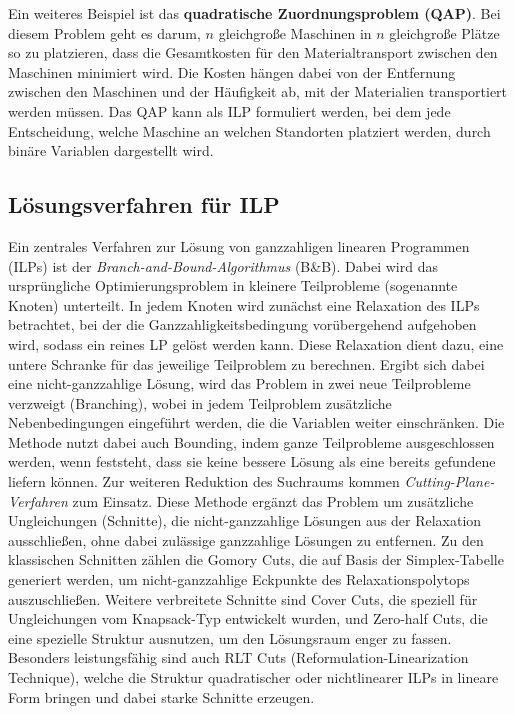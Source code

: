 \documentclass[bachelor, german]{algothesis}
\begin{document}
Ein weiteres Beispiel ist das \textbf{quadratische Zuordnungsproblem (QAP)}. Bei diesem Problem geht es darum, $n$ gleichgroße Maschinen in $n$ gleichgroße Plätze so zu platzieren, dass die Gesamtkosten für den Materialtransport zwischen den Maschinen minimiert wird. Die Kosten hängen dabei von der Entfernung zwischen den Maschinen und der Häufigkeit ab, mit der Materialien transportiert werden müssen. Das QAP kann als ILP formuliert werden, bei dem jede Entscheidung, welche Maschine an welchen Standorten platziert werden, durch binäre Variablen dargestellt wird.

\subsection{Lösungsverfahren für ILP}
Ein zentrales Verfahren zur Lösung von ganzzahligen linearen Programmen (ILPs) ist der \emph{Branch-and-Bound-Algorithmus} (B\&B). Dabei wird das ursprüngliche Optimierungsproblem in kleinere Teilprobleme (sogenannte Knoten) unterteilt. In jedem Knoten wird zunächst eine Relaxation des ILPs betrachtet, bei der die Ganzzahligkeitsbedingung vorübergehend aufgehoben wird, sodass ein reines LP gelöst werden kann. Diese Relaxation dient dazu, eine untere Schranke für das jeweilige Teilproblem zu berechnen. Ergibt sich dabei eine nicht-ganzzahlige Lösung, wird das Problem in zwei neue Teilprobleme verzweigt (Branching), wobei in jedem Teilproblem zusätzliche Nebenbedingungen eingeführt werden, die die Variablen weiter einschränken. Die Methode nutzt dabei auch Bounding, indem ganze Teilprobleme ausgeschlossen werden, wenn feststeht, dass sie keine bessere Lösung als eine bereits gefundene liefern können.\newline
Zur weiteren Reduktion des Suchraums kommen \emph{Cutting-Plane-Verfahren} zum Einsatz. Diese Methode ergänzt das Problem um zusätzliche Ungleichungen (Schnitte), die nicht-ganzzahlige Lösungen aus der Relaxation ausschließen, ohne dabei zulässige ganzzahlige Lösungen zu entfernen. Zu den klassischen Schnitten zählen die Gomory Cuts, die auf Basis der Simplex-Tabelle generiert werden, um nicht-ganzzahlige Eckpunkte des Relaxationspolytops auszuschließen. Weitere verbreitete Schnitte sind Cover Cuts, die speziell für Ungleichungen vom Knapsack-Typ entwickelt wurden, und Zero-half Cuts, die eine spezielle Struktur ausnutzen, um den Lösungsraum enger zu fassen. Besonders leistungsfähig sind auch RLT Cuts (Reformulation-Linearization Technique), welche die Struktur quadratischer oder nichtlinearer ILPs in lineare Form bringen und dabei starke Schnitte erzeugen.\newline
\end{document}
